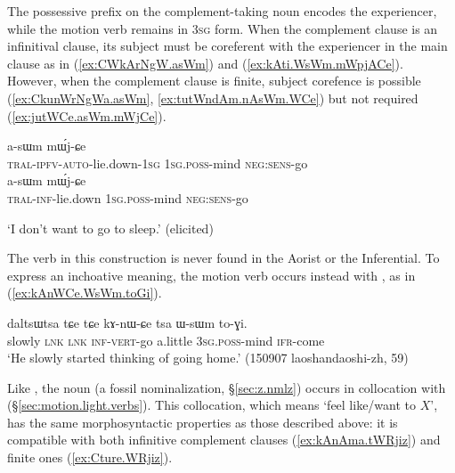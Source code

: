 The possessive prefix on the complement-taking noun encodes the experiencer, while the motion verb  remains in \textsc{3sg} form. When the complement clause is an infinitival clause, its subject must be coreferent with the experiencer in the main clause as in (\ref{ex:CWkArNgW.asWm}) and (\ref{ex:kAti.WsWm.mWpjACe}). However, when the complement clause is finite, subject corefence is possible (\ref{ex:CkunWrNgWa.asWm}, \ref{ex:tutWndAm.nAsWm.WCe}) but not required (\ref{ex:jutWCe.asWm.mWjCe}).

\begin{exe}
\ex 
\begin{xlist}
\ex  \label{ex:CkunWrNgWa.asWm}
\gll [ɕ-ku-nɯ-rŋgɯ-a] a-sɯm mɯ́j-ɕe \\
\textsc{tral}-\textsc{ipfv}-\textsc{auto}-lie.down-\textsc{1sg} \textsc{1sg}.\textsc{poss}-mind \textsc{neg}:\textsc{sens}-go \\
\ex  \label{ex:CWkArNgW.asWm}
\gll [ɕɯ-kɤ-rŋgɯ] a-sɯm mɯ́j-ɕe \\
\textsc{tral}-\textsc{inf}-lie.down \textsc{1sg}.\textsc{poss}-mind \textsc{neg}:\textsc{sens}-go \\
\end{xlist}
\glt `I don't want to go to sleep.' (elicited)
\end{exe}

The verb  in this construction is never found in the Aorist or the Inferential. To express an inchoative meaning, the motion verb  occurs instead with , as in (\ref{ex:kAnWCe.WsWm.toGi}).

\begin{exe}
\ex  \label{ex:kAnWCe.WsWm.toGi}
\gll daltsɯtsa tɕe tɕe kɤ-nɯ-ɕe tsa ɯ-sɯm to-ɣi.  \\
slowly \textsc{lnk} \textsc{lnk} \textsc{inf}-\textsc{vert}-go a.little \textsc{3sg}.\textsc{poss}-mind \textsc{ifr}-come \\
\glt `He slowly started thinking of going home.' (150907 laoshandaoshi-zh, 59)
\end{exe}

Like , the noun  (a fossil  nominalization, §\ref{sec:z.nmlz}) occurs in collocation with  (§\ref{sec:motion.light.verbs}). This collocation, which means `feel like/want to $X$', has the same morphosyntactic properties as those described above: it is compatible with both infinitive complement clauses (\ref{ex:kAnAma.tWRjiz}) and finite ones (\ref{ex:Cture.WRjiz}).

